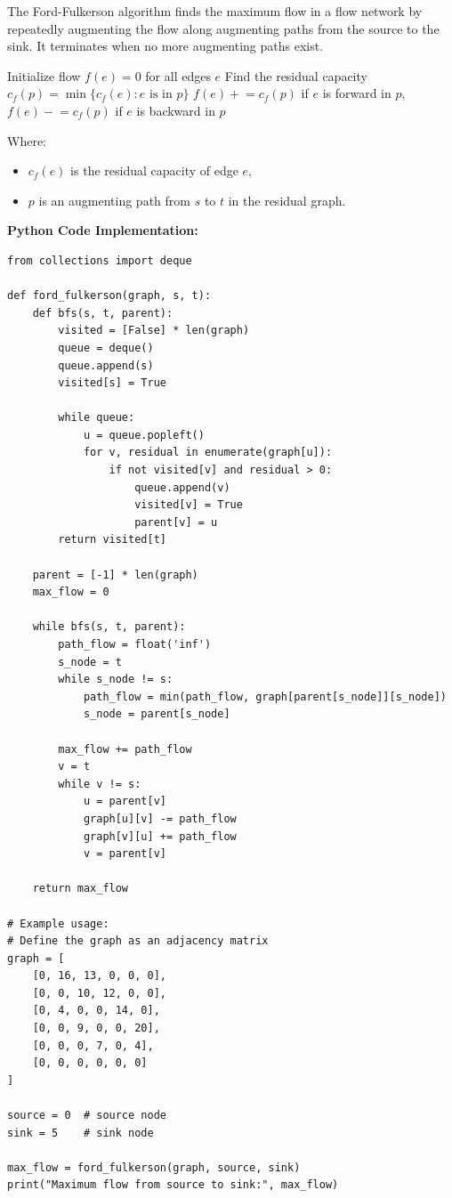 \documentclass[12pt]{book} %
\begin{document}
The Ford-Fulkerson algorithm finds the maximum flow in a flow network by repeatedly augmenting the flow along augmenting paths from the source to the sink. It terminates when no more augmenting paths exist.
\FloatBarrier
\begin{algorithm}[H]
\caption{Ford-Fulkerson Algorithm}\label{alg:ford-fulkerson}
\begin{algorithmic}[1]
    \State Initialize flow $f(e) = 0$ for all edges $e$
        \State Find the residual capacity $c_f(p) = \min\{c_f(e) : e \text{ is in } p\}$
            \State $f(e) \mathrel{+}= c_f(p)$ if $e$ is forward in $p$, $f(e) \mathrel{-}= c_f(p)$ if $e$ is backward in $p$
        \EndFor
    \EndWhile
\EndProcedure
\end{algorithmic}
\end{algorithm}
\FloatBarrier
Where:
\begin{itemize}
    \item $c_f(e)$ is the residual capacity of edge $e$,
    \item $p$ is an augmenting path from $s$ to $t$ in the residual graph.
\end{itemize}

\textbf{Python Code Implementation:}
\FloatBarrier
\begin{lstlisting}
from collections import deque

def ford_fulkerson(graph, s, t):
    def bfs(s, t, parent):
        visited = [False] * len(graph)
        queue = deque()
        queue.append(s)
        visited[s] = True
        
        while queue:
            u = queue.popleft()
            for v, residual in enumerate(graph[u]):
                if not visited[v] and residual > 0:
                    queue.append(v)
                    visited[v] = True
                    parent[v] = u
        return visited[t]
    
    parent = [-1] * len(graph)
    max_flow = 0
    
    while bfs(s, t, parent):
        path_flow = float('inf')
        s_node = t
        while s_node != s:
            path_flow = min(path_flow, graph[parent[s_node]][s_node])
            s_node = parent[s_node]
        
        max_flow += path_flow
        v = t
        while v != s:
            u = parent[v]
            graph[u][v] -= path_flow
            graph[v][u] += path_flow
            v = parent[v]
    
    return max_flow

# Example usage:
# Define the graph as an adjacency matrix
graph = [
    [0, 16, 13, 0, 0, 0],
    [0, 0, 10, 12, 0, 0],
    [0, 4, 0, 0, 14, 0],
    [0, 0, 9, 0, 0, 20],
    [0, 0, 0, 7, 0, 4],
    [0, 0, 0, 0, 0, 0]
]

source = 0  # source node
sink = 5    # sink node

max_flow = ford_fulkerson(graph, source, sink)
print("Maximum flow from source to sink:", max_flow)
\end{lstlisting}
\end{document}
